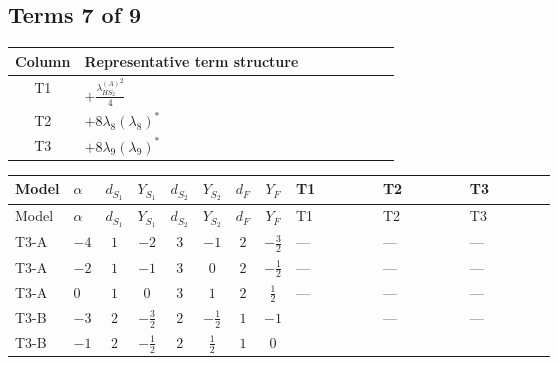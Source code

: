 \documentclass[8pt]{article}
\begin{document}
\begin{landscape}
\subsection*{Terms 7 of 9}
\begin{center}
\begin{tabular}{@{}c >{\raggedright\arraybackslash}p{0.82\linewidth}@{}}
\toprule
Column & Representative term structure \\
\midrule
T1 & \(\displaystyle +\frac{{\lambda_{HS_2}^{(A)}}^2}{4}\) \\
\midrule
T2 & \(\displaystyle +8 {\lambda_{8}} \left({\lambda_{8}}\right)^{*}\) \\
\midrule
T3 & \(\displaystyle +8 {\lambda_{9}} \left({\lambda_{9}}\right)^{*}\) \\
\midrule
\bottomrule
\end{tabular}
\end{center}
\smallskip
\tiny
\begin{longtable}{@{}llcccccc >{\raggedright\arraybackslash}p{0.21\linewidth} >{\raggedright\arraybackslash}p{0.21\linewidth} >{\raggedright\arraybackslash}p{0.21\linewidth}@{}}
\toprule
Model & $\alpha$ & $d_{S_1}$ & $Y_{S_1}$ & $d_{S_2}$ & $Y_{S_2}$ & $d_F$ & $Y_F$ & T1 & T2 & T3 \\
\midrule
\endfirsthead
\toprule
Model & $\alpha$ & $d_{S_1}$ & $Y_{S_1}$ & $d_{S_2}$ & $Y_{S_2}$ & $d_F$ & $Y_F$ & T1 & T2 & T3 \\
\midrule
\endhead
T3-A & $-4$ & $1$ & $-2$ & $3$ & $-1$ & $2$ & $-\frac{3}{2}$ & --- & --- & --- \\
\midrule
T3-A & $-2$ & $1$ & $-1$ & $3$ & $0$ & $2$ & $-\frac{1}{2}$ & --- & --- & --- \\
\midrule
T3-A & $0$ & $1$ & $0$ & $3$ & $1$ & $2$ & $\frac{1}{2}$ & --- & --- & --- \\
\midrule
T3-B & $-3$ & $2$ & $-\frac{3}{2}$ & $2$ & $-\frac{1}{2}$ & $1$ & $-1$ & \scriptsize\adjustbox{max width=\linewidth}{$\begin{gathered} +\frac{{\lambda_{HS_2}^{(A)}}^2}{4}\end{gathered}$} & --- & --- \\
\midrule
T3-B & $-1$ & $2$ & $-\frac{1}{2}$ & $2$ & $\frac{1}{2}$ & $1$ & $0$ & \scriptsize\adjustbox{max width=\linewidth}{$\begin{gathered} +\frac{{\lambda_{HS_2}^{(A)}}^2}{4}\end{gathered}$} & \scriptsize\adjustbox{max width=\linewidth}{$\begin{gathered} +8 {\lambda_{8}} \left({\lambda_{8}}\right)^{*}\end{gathered}$} & \scriptsize\adjustbox{max width=\linewidth}{$\begin{gathered} +8 {\lambda_{9}} \left({\lambda_{9}}\right)^{*}\end{gathered}$} \\

\end{longtable}
\end{landscape}
\end{document}
